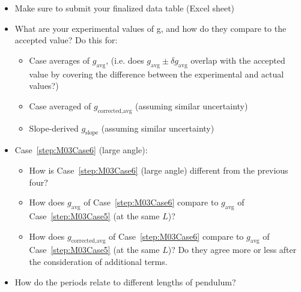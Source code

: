 \begin{itemize}
\item Make sure to submit your finalized data table (Excel sheet)
\item What are your experimental values of g, and how do they compare to the accepted value? Do this for:
\begin{itemize}
    \item Case averages of $g_{\text{avg}}$, (i.e. does $g_{\text{avg}} \pm \delta g_{\text{avg}}$ overlap with the accepted value by covering the difference between the experimental and actual values?)
    \item Case averaged of $g_\text{corrected,avg}$ (assuming similar uncertainty)
    \item Slope-derived $g_\text{slope}$ (assuming similar uncertainty)
\end{itemize}
\item Case~\ref{step:M03Case6} (large angle):
\begin{itemize}
    \item How is Case~\ref{step:M03Case6} (large angle) different from the previous four?
    \item How does $g_\text{avg}$ of Case~\ref{step:M03Case6} compare to $g_{\text{avg}}$ of Case~\ref{step:M03Case5} (at the same $L$)? 
    \item How does $g_\text{corrected,avg}$ of Case~\ref{step:M03Case6} compare to $g_{\text{avg}}$ of Case~\ref{step:M03Case5} (at the same $L$)? Do they agree more or less after the consideration of additional terms.
\end{itemize}
\item How do the periods relate to different lengths of pendulum?


\end{itemize}




